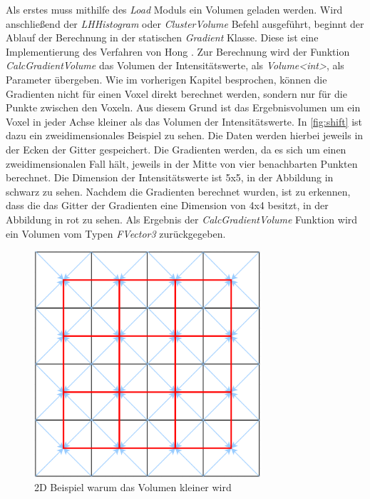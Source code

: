 Als erstes muss mithilfe des \textit{Load} Moduls ein Volumen geladen werden. Wird anschließend der  \textit{LHHistogram} oder \textit{ClusterVolume} Befehl ausgeführt, beginnt der Ablauf der Berechnung in der statischen \textit{Gradient} Klasse.
Diese ist eine Implementierung des Verfahren von Hong \cite{hong2003method}. Zur Berechnung wird der Funktion \textit{CalcGradientVolume} das Volumen der Intensitätswerte, als \textit{Volume<int>}, als Parameter übergeben. Wie im vorherigen Kapitel besprochen, können die Gradienten nicht für einen Voxel direkt berechnet werden, sondern nur für die Punkte zwischen den Voxeln. Aus diesem Grund ist das Ergebnisvolumen um ein Voxel in jeder Achse kleiner als das Volumen der Intensitätswerte.
\newline
In \autoref{fig:shift} ist dazu ein zweidimensionales Beispiel zu sehen. Die Daten werden hierbei jeweils in der Ecken der Gitter gespeichert. Die Gradienten werden, da es sich um einen zweidimensionalen Fall hält, jeweils in der Mitte von vier benachbarten Punkten berechnet.
Die Dimension der Intensitätswerte ist 5x5, in der Abbildung in schwarz zu sehen. Nachdem die Gradienten berechnet wurden, ist zu erkennen, dass die das Gitter der Gradienten eine Dimension von 4x4 besitzt, in der Abbildung in rot zu sehen.
Als Ergebnis der \textit{CalcGradientVolume} Funktion wird ein Volumen vom Typen \textit{FVector3} zurückgegeben.


\begin{figure}
\centering 
\includegraphics[width=0.75\textwidth]{Logos/VoxelShift.png}
\caption{2D Beispiel warum das Volumen kleiner wird} 
\label{fig:shift} 
\end{figure}


